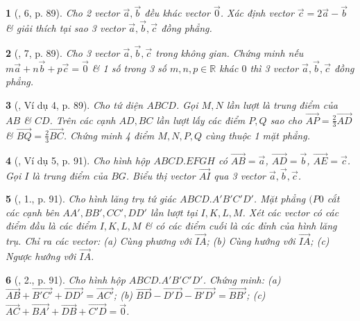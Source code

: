 \documentclass{article}
\newtheorem{baitoan}{}
\begin{document}
\begin{baitoan}[\cite{SGK_Toan_11_hinh_hoc_co_ban}, 6, p. 89]
	Cho 2 vector $\vec{a},\vec{b}$ đều khác vector $\vec{0}$. Xác định vector $\vec{c} = 2\vec{a} - \vec{b}$ \& giải thích tại sao 3 vector $\vec{a},\vec{b},\vec{c}$ đồng phẳng.
\end{baitoan}

\begin{baitoan}[\cite{SGK_Toan_11_hinh_hoc_co_ban}, 7, p. 89]
	Cho 3 vector $\vec{a},\vec{b},\vec{c}$ trong không gian. Chứng minh nếu $m\vec{a} + n\vec{b} + p\vec{c} = \vec{0}$ \& 1 số trong 3 số $m,n,p\in\mathbb{R}$ khác $0$ thì 3 vector $\vec{a},\vec{b},\vec{c}$ đồng phẳng.
\end{baitoan}

\begin{baitoan}[\cite{SGK_Toan_11_hinh_hoc_co_ban}, Ví dụ 4, p. 89]
	Cho tứ diện $ABCD$. Gọi $M,N$ lần lượt là trung điểm của $AB$ \& $CD$. Trên các cạnh $AD,BC$ lần lượt lấy các điểm $P,Q$ sao cho $\overrightarrow{AP} = \frac{2}{3}\overrightarrow{AD}$ \& $\overrightarrow{BQ} = \frac{2}{3}\overrightarrow{BC}$. Chứng minh 4 điểm $M,N,P,Q$ cùng thuộc 1 mặt phẳng.
\end{baitoan}

\begin{baitoan}[\cite{SGK_Toan_11_hinh_hoc_co_ban}, Ví dụ 5, p. 91]
	Cho hình hộp $ABCD.EFGH$ có $\overrightarrow{AB} = \vec{a}$, $\overrightarrow{AD} = \vec{b}$, $\overrightarrow{AE} = \vec{c}$. Gọi $I$ là trung điểm của $BG$. Biểu thị vector $\overrightarrow{AI}$ qua 3 vector $\vec{a},\vec{b},\vec{c}$.
\end{baitoan}

\begin{baitoan}[\cite{SGK_Toan_11_hinh_hoc_co_ban}, 1., p. 91]
	Cho hình lăng trụ tứ giác $ABCD.A'B'C'D'$. Mặt phẳng $(P0$ cắt các cạnh bên $AA',BB',CC',DD'$ lần lượt tại $I,K,L,M$. Xét các vector có các điểm đầu là các điểm $I,K,L,M$ \& có các điểm cuối là các đỉnh của hình lăng trụ. Chỉ ra các vector: (a) Cùng phương với $\overrightarrow{IA}$; (b) Cùng hướng với $\overrightarrow{IA}$; (c) Ngược hướng với $\overrightarrow{IA}$.
\end{baitoan}

\begin{baitoan}[\cite{SGK_Toan_11_hinh_hoc_co_ban}, 2., p. 91]
	Cho hình hộp $ABCD.A'B'C'D'$. Chứng minh: (a) $\overrightarrow{AB} + \overrightarrow{B'C'} + \overrightarrow{DD'} = \overrightarrow{AC'}$; (b) $\overrightarrow{BD} - \overrightarrow{D'D} - \overrightarrow{B'D'} = \overrightarrow{BB'}$; (c) $\overrightarrow{AC} + \overrightarrow{BA'} + \overrightarrow{DB} + \overrightarrow{C'D} = \vec{0}$.
\end{baitoan}
\end{document}
